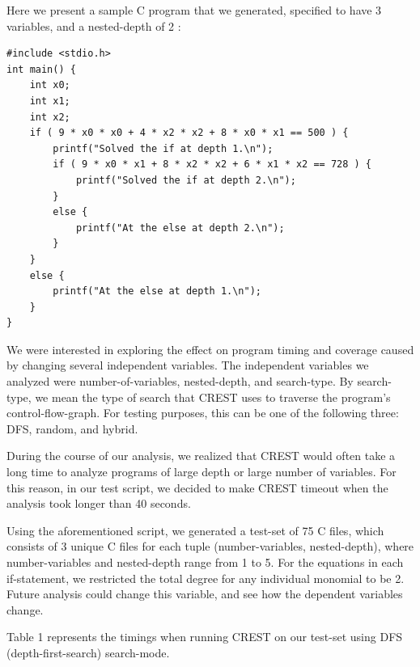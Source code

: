 \documentclass[oribibl]{llncs}
\begin{document}
Here we present a sample C program that we generated, specified to have 3 variables, and a nested-depth of 2 :

\begin{verbatim}
#include <stdio.h>
int main() {
	int x0;
	int x1;
	int x2;
    if ( 9 * x0 * x0 + 4 * x2 * x2 + 8 * x0 * x1 == 500 ) {
        printf("Solved the if at depth 1.\n");
        if ( 9 * x0 * x1 + 8 * x2 * x2 + 6 * x1 * x2 == 728 ) {
            printf("Solved the if at depth 2.\n");
        }
        else {
        	printf("At the else at depth 2.\n");
        }
    }
    else {
        printf("At the else at depth 1.\n");
    }
}
\end{verbatim}

We were interested in exploring the effect on program timing and coverage caused by changing several independent variables. The independent variables we analyzed were number-of-variables, nested-depth, and search-type. By search-type, we mean the type of search that CREST uses to traverse the program's control-flow-graph. For testing purposes, this can be one of the following three: DFS, random, and hybrid.

During the course of our analysis, we realized that CREST would often take a long time to analyze programs of large depth or large number of variables. For this reason, in our test script, we decided to make CREST timeout when the analysis took longer than 40 seconds.

Using the aforementioned script, we generated a test-set of 75 C files, which consists of 3 unique C files for each tuple (number-variables, nested-depth), where number-variables and nested-depth range from 1 to 5. For the equations in each if-statement, we restricted the total degree for any individual monomial to be 2. Future analysis could change this variable, and see how the dependent variables change.



Table 1 represents the timings when running CREST on our test-set using DFS (depth-first-search) search-mode.
\end{document}
